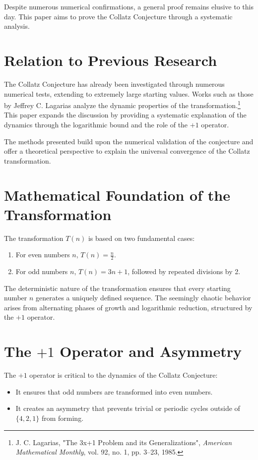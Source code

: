 \documentclass[a4paper,12pt]{article}
\begin{document}
Despite numerous numerical confirmations, a general proof remains elusive to this day. This paper aims to prove the Collatz Conjecture through a systematic analysis.
\section{Relation to Previous Research}
The Collatz Conjecture has already been investigated through numerous numerical tests, extending to extremely large starting values. Works such as those by Jeffrey C. Lagarias analyze the dynamic properties of the transformation.\footnote{J. C. Lagarias, "The 3x+1 Problem and its Generalizations", \textit{American Mathematical Monthly}, vol. 92, no. 1, pp. 3–23, 1985.} This paper expands the discussion by providing a systematic explanation of the dynamics through the logarithmic bound and the role of the \(+1\) operator.

The methods presented build upon the numerical validation of the conjecture and offer a theoretical perspective to explain the universal convergence of the Collatz transformation.

\section{Mathematical Foundation of the Transformation}
The transformation \( T(n) \) is based on two fundamental cases:
\begin{enumerate}
    \item For even numbers \( n \), \( T(n) = \frac{n}{2} \).
    \item For odd numbers \( n \), \( T(n) = 3n + 1 \), followed by repeated divisions by 2.
\end{enumerate}

The deterministic nature of the transformation ensures that every starting number \( n \) generates a uniquely defined sequence. The seemingly chaotic behavior arises from alternating phases of growth and logarithmic reduction, structured by the \(+1\) operator.

\section{The \(+1\) Operator and Asymmetry}
The \(+1\) operator is critical to the dynamics of the Collatz Conjecture:
\begin{itemize}
    \item It ensures that odd numbers are transformed into even numbers.
    \item It creates an asymmetry that prevents trivial or periodic cycles outside of \( \{4, 2, 1\} \) from forming.
\end{itemize}
\end{document}

